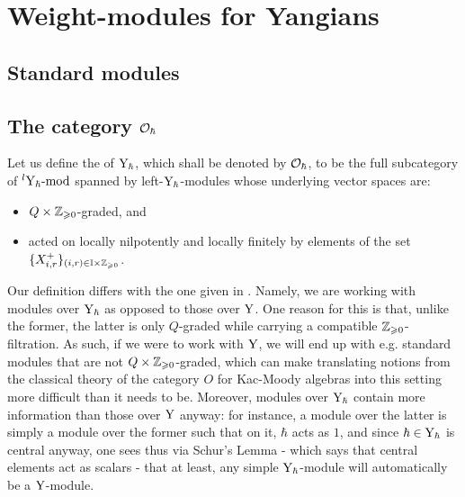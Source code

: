 \section{Weight-modules for Yangians}
    \subsection{Standard modules}
        

    \subsection{The category \texorpdfstring{$\mathcal{O}_{\hbar}$}{}}
        \begin{definition}[Category $O$] \label{def: category_0}
            Let us define the  of $\mathrm{Y}_{\hbar}$, which shall be denoted by $\mathcal{O}_{\hbar}$, to be the full subcategory of ${}^l\mathrm{Y}_{\hbar}\text{-}\mathrm{mod}$ spanned by left-$\mathrm{Y}_{\hbar}$-modules whose underlying vector spaces are:
            \begin{itemize}
                \item $Q \x \Z_{\geq 0}$-graded, and
                \item acted on locally nilpotently and locally finitely by elements of the set $\{X_{i, r}^+\}_{(i, r) \in \simpleroots \x \Z_{\geq 0}}$.
            \end{itemize}
        \end{definition}
        \begin{remark}
            Our definition differs with the one given in \cite[Section 3]{guay_nakajima_wendlandt_affine_yangian_coproduct}. Namely, we are working with modules over $\mathrm{Y}_{\hbar}$ as opposed to those over $\mathrm{Y}$. One reason for this is that, unlike the former, the latter is only $Q$-graded while carrying a compatible $\mathbb{Z}_{\geqslant 0}$-filtration. As such, if we were to work with $\mathrm{Y}$, we will end up with e.g. standard modules that are not $Q \x \Z_{\geq 0}$-graded, which can make translating notions from the classical theory of the category $O$ for Kac-Moody algebras into this setting more difficult than it needs to be. Moreover, modules over $\mathrm{Y}_{\hbar}$ contain more information than those over $\mathrm{Y}$ anyway: for instance, a module over the latter is simply a module over the former such that on it, $\hbar$ acts as $1$, and since $\hbar \in \mathrm{Y}_{\hbar}$ is central anyway, one sees thus via Schur's Lemma - which says that central elements act as scalars - that at least, any simple $\mathrm{Y}_{\hbar}$-module will automatically be a $\mathrm{Y}$-module.
        \end{remark}
